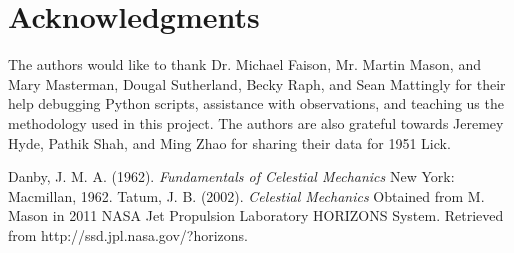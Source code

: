 \documentclass[12pt,journal,compsoc]{IEEEtran}
\begin{document}

\section*{Acknowledgments}

The authors would like to thank Dr. Michael Faison, Mr. Martin Mason, and Mary Masterman, 
Dougal Sutherland, Becky Raph, and Sean Mattingly for their help debugging Python scripts, assistance with observations, and teaching us the methodology used in this project.
The authors are also grateful towards Jeremey Hyde, Pathik Shah, and Ming Zhao for sharing their
data for 1951 Lick.


\begin{thebibliography}{1}
Danby, J. M. A. (1962). \emph{Fundamentals of Celestial Mechanics} New York: Macmillan, 1962. 
Tatum, J. B. (2002). \emph{Celestial Mechanics} Obtained from M. Mason in 2011
{}
NASA Jet Propulsion Laboratory HORIZONS System. Retrieved from http://ssd.jpl.nasa.gov/?horizons.
\end{thebibliography}
\end{document}
